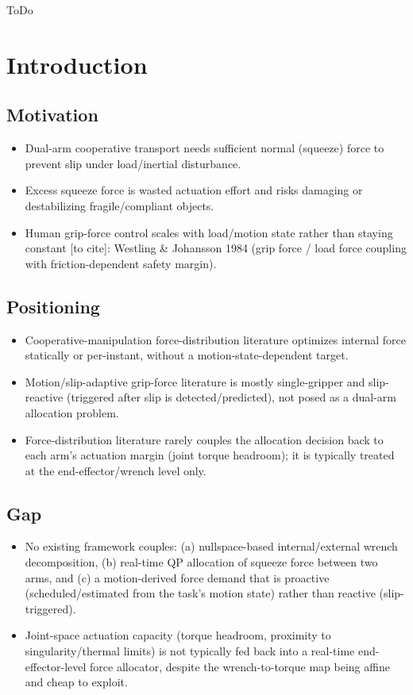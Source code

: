 \documentclass[conference]{IEEEtran}
\begin{document}
\begin{IEEEkeywords}
ToDo \cite{uchiyama1988symmetric}
\end{IEEEkeywords}

\section*{Introduction}

\subsection*{Motivation}
    \begin{itemize}
        \item Dual-arm cooperative transport needs sufficient normal (squeeze) force to prevent slip under load/inertial disturbance.
        \item Excess squeeze force is wasted actuation effort and risks damaging or destabilizing fragile/compliant objects.
        \item Human grip-force control scales with load/motion state rather than staying constant [to cite]: Westling \& Johansson 1984 (grip force / load force coupling with friction-dependent safety margin).
    \end{itemize}
\subsection*{Positioning}
\begin{itemize}
    \item Cooperative-manipulation force-distribution literature optimizes internal force statically or per-instant, without a motion-state-dependent target.
    \item Motion/slip-adaptive grip-force literature is mostly single-gripper and slip-reactive (triggered after slip is detected/predicted), not posed as a dual-arm allocation problem.
    \item Force-distribution literature rarely couples the allocation decision back to each arm's actuation margin (joint torque headroom); it is typically treated at the end-effector/wrench level only.
\end{itemize}
\subsection*{Gap}
\begin{itemize}
    \item No existing framework couples: (a) nullspace-based internal/external wrench decomposition, (b) real-time QP allocation of squeeze force between two arms, and (c) a motion-derived force demand that is proactive (scheduled/estimated from the task's motion state) rather than reactive (slip-triggered).
    \item Joint-space actuation capacity (torque headroom, proximity to singularity/thermal limits) is not typically fed back into a real-time end-effector-level force allocator, despite the wrench-to-torque map being affine and cheap to exploit.
\end{itemize}
\end{document}
